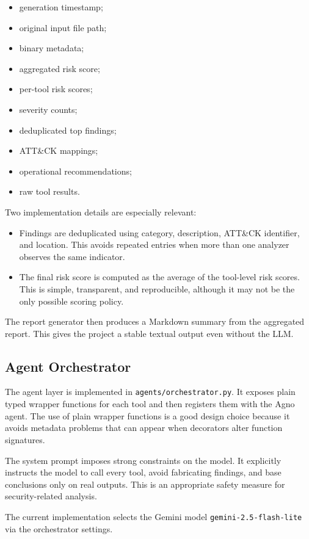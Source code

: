 \documentclass[11pt,a4paper]{article}
\begin{document}
\begin{itemize}
\item generation timestamp;
\item original input file path;
\item binary metadata;
\item aggregated risk score;
\item per-tool risk scores;
\item severity counts;
\item deduplicated top findings;
\item ATT\&CK mappings;
\item operational recommendations;
\item raw tool results.
\end{itemize}

Two implementation details are especially relevant:

\begin{itemize}
\item Findings are deduplicated using category, description, ATT\&CK identifier, and location. This avoids repeated entries when more than one analyzer observes the same indicator.
\item The final risk score is computed as the average of the tool-level risk scores. This is simple, transparent, and reproducible, although it may not be the only possible scoring policy.
\end{itemize}

The report generator then produces a Markdown summary from the aggregated report. This gives the project a stable textual output even without the LLM.

\subsection{Agent Orchestrator}
The agent layer is implemented in \texttt{agents/orchestrator.py}. It exposes plain typed wrapper functions for each tool and then registers them with the Agno agent. The use of plain wrapper functions is a good design choice because it avoids metadata problems that can appear when decorators alter function signatures.

The system prompt imposes strong constraints on the model. It explicitly instructs the model to call every tool, avoid fabricating findings, and base conclusions only on real outputs. This is an appropriate safety measure for security-related analysis.

The current implementation selects the Gemini model \texttt{gemini-2.5-flash-lite} via the orchestrator settings.
\end{document}
